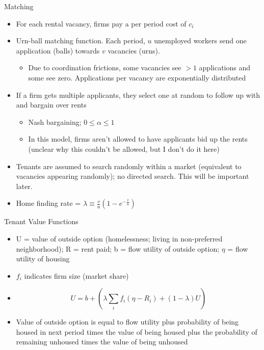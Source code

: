 \documentclass[10pt, xcolor=dvipsnames]{beamer}
\begin{document}
\begin{frame}{Matching}
    \begin{itemize}
    \item For each rental vacancy, firms pay a per period cost of $c_i$
    \item Urn-ball matching function. Each period, $u$ unemployed workers send one application (balls) towards $v$ vacancies (urns).
    \begin{itemize}
        \item Due to coordination frictions, some vacancies see $>1$ applications and some see zero. Applications per vacancy are exponentially distributed
    \end{itemize}
    \item If a firm gets multiple applicants, they select one at random to follow up with and bargain over rents
    \begin{itemize}
        \item Nash bargaining; $0 \leq \alpha \leq 1$
        \item In this model, firms aren't allowed to have applicants bid up the rents (unclear why this couldn't be allowed, but I don't do it here)
        
    \end{itemize}
    \item Tenants are assumed to search randomly within a market (equivalent to vacancies appearing randomly); no directed search. This will be important later.
    \item Home finding rate = $\lambda \equiv \frac{v}{u}(1-e^{-\frac{v}{u}})$
\end{itemize}
\end{frame}

\begin{frame}{Tenant Value Functions}
\begin{itemize}
    \item U = value of outside option (homelessness; living in non-preferred neighborhood); R = rent paid; b = flow utility of outside option; $\eta$ = flow utility of housing
    \item $f_i$ indicates firm size (market share)
    \item \begin{equation}
        U = b + \left(\lambda \sum_{i} f_i(\eta - R_i) + (1-\lambda)U\right)\label{eq:worker-val}
    \end{equation}
    \item Value of outside option is equal to flow utility plus probability of being housed in next period times the value of being housed plus the probability of remaining unhoused times the value of being unhoused
\end{itemize}
\end{frame}
\end{document}

